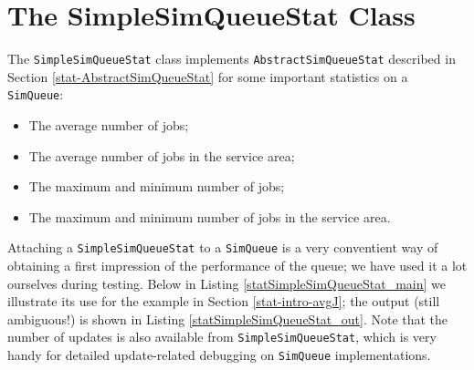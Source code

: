 \documentclass[12pt]{book}
\begin{document}
\section{The SimpleSimQueueStat Class}
\label{stat-SimpleSimQueueStat}

The \lstinline|SimpleSimQueueStat| class implements
  \lstinline|AbstractSimQueueStat| described in Section \ref{stat-AbstractSimQueueStat}
  for some important statistics on a \lstinline|SimQueue|:
\begin{itemize}
\item The average number of jobs;
\item The average number of jobs in the service area;
\item The maximum and minimum number of jobs;
\item The maximum and minimum number of jobs in the service area.
\end{itemize}
Attaching a \lstinline|SimpleSimQueueStat| to a \lstinline|SimQueue| is a very conventient
  way of obtaining a first impression of the performance of the queue;
  we have used it a lot ourselves during testing.
Below in Listing \ref{statSimpleSimQueueStat_main}
  we illustrate its use for the example in Section \ref{stat-intro-avgJ};
  the output (still ambiguous!) is shown in Listing \ref{statSimpleSimQueueStat_out}.
Note that the number of updates is also available from \lstinline-SimpleSimQueueStat-,
  which is very handy for detailed update-related debugging on \lstinline-SimQueue- implementations.
\end{document}
